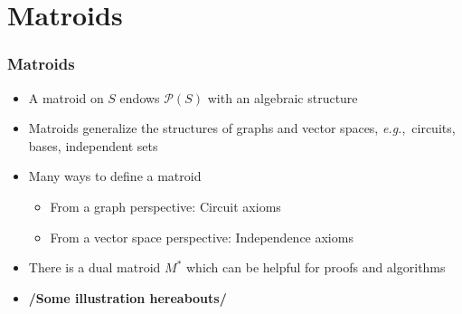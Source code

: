 \documentclass[bigger]{beamer}
\newcommand{\eg}{{\em e.g.},~}
\begin{document}
\section{Matroids}



\begin{frame}
\frametitle{Matroids}
\begin{itemize}


\item A matroid on $S$ endows $\mathcal{P}(S)$ with an algebraic
  structure 
\item Matroids generalize the structures of graphs and vector spaces,
  \eg circuits, bases, independent sets
\item Many ways to define a matroid
  \begin{itemize}
  \item From a graph perspective: Circuit axioms
  \item From a vector space perspective: Independence axioms
  \end{itemize}
\item There is a dual matroid $M^*$ which can be helpful for proofs and algorithms 
\item \textbf{/Some illustration hereabouts/}
\end{itemize} %
\end{frame}







\end{document}
